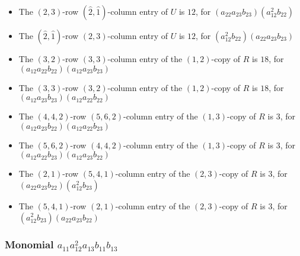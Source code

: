 \documentclass{article}
\begin{document}
\begin{itemize}
\item The $ \left(2, 3\right) $-row $ (\hat{2}, \hat{1}) $-column entry of $U$ is $ 12 $, for $( a_{22} a_{23} b_{23} )( a_{12}^{2} b_{22} )$ 
\item The $(\hat{2}, \hat{1})$-row $ \left(2, 3\right) $-column entry of $U$ is $ 12 $, for $( a_{12}^{2} b_{22} )( a_{22} a_{23} b_{23} )$ 
\item The $(3, 2)$-row $(3, 3)$-column entry of the $ \left(1, 2\right) $-copy of $R$ is $ 18 $, for $( a_{12} a_{22} b_{22} )( a_{12} a_{23} b_{23} )$ 
\item The $(3, 3)$-row $(3, 2)$-column entry of the $ \left(1, 2\right) $-copy of $R$ is $ 18 $, for $( a_{12} a_{23} b_{23} )( a_{12} a_{22} b_{22} )$ 
\item The $(4, 4, 2)$-row $(5, 6, 2)$-column entry of the $ \left(1, 3\right) $-copy of $R$ is $ 3 $, for $( a_{12} a_{23} b_{22} )( a_{12} a_{22} b_{23} )$ 
\item The $(5, 6, 2)$-row $(4, 4, 2)$-column entry of the $ \left(1, 3\right) $-copy of $R$ is $ 3 $, for $( a_{12} a_{22} b_{23} )( a_{12} a_{23} b_{22} )$ 
\item The $(2, 1)$-row $(5, 4, 1)$-column entry of the $ \left(2, 3\right) $-copy of $R$ is $ 3 $, for $( a_{22} a_{23} b_{22} )( a_{12}^{2} b_{23} )$ 
\item The $(5, 4, 1)$-row $(2, 1)$-column entry of the $ \left(2, 3\right) $-copy of $R$ is $ 3 $, for $( a_{12}^{2} b_{23} )( a_{22} a_{23} b_{22} )$ 
\end{itemize}
\subsubsection{Monomial $ a_{11} a_{12}^{2} a_{13} b_{11} b_{13} $}
\end{document}

